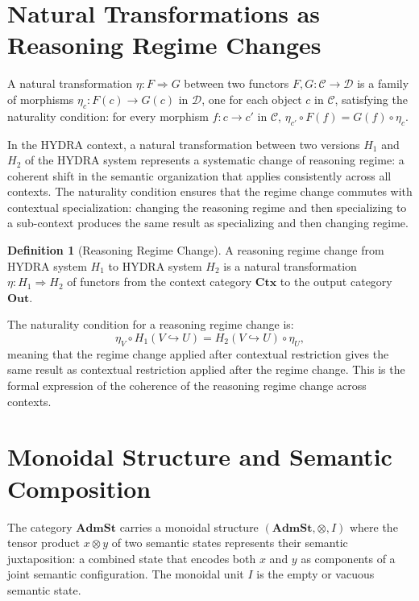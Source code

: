 \documentclass[12pt, a4paper, openany]{book}
\theoremstyle{plain}
\theoremstyle{definition}
\newtheorem{definition}[theorem]{Definition}
\theoremstyle{remark}
\begin{document}
\section{Natural Transformations as Reasoning Regime Changes}

A natural transformation $\eta: F \Rightarrow G$ between two functors $F, G: \mathcal{C} \to \mathcal{D}$ is a family of morphisms $\eta_c: F(c) \to G(c)$ in $\mathcal{D}$, one for each object $c$ in $\mathcal{C}$, satisfying the naturality condition: for every morphism $f: c \to c'$ in $\mathcal{C}$, $\eta_{c'} \circ F(f) = G(f) \circ \eta_c$.

In the HYDRA context, a natural transformation between two versions $H_1$ and $H_2$ of the HYDRA system represents a systematic change of reasoning regime: a coherent shift in the semantic organization that applies consistently across all contexts. The naturality condition ensures that the regime change commutes with contextual specialization: changing the reasoning regime and then specializing to a sub-context produces the same result as specializing and then changing regime.

\begin{definition}[Reasoning Regime Change]
A reasoning regime change from HYDRA system $H_1$ to HYDRA system $H_2$ is a natural transformation $\eta: H_1 \Rightarrow H_2$ of functors from the context category $\mathbf{Ctx}$ to the output category $\mathbf{Out}$.
\end{definition}

The naturality condition for a reasoning regime change is:
\[
\eta_V \circ H_1(V \hookrightarrow U) = H_2(V \hookrightarrow U) \circ \eta_U,
\]
meaning that the regime change applied after contextual restriction gives the same result as contextual restriction applied after the regime change. This is the formal expression of the coherence of the reasoning regime change across contexts.

\section{Monoidal Structure and Semantic Composition}

The category $\mathbf{AdmSt}$ carries a monoidal structure $(\mathbf{AdmSt}, \otimes, I)$ where the tensor product $x \otimes y$ of two semantic states represents their semantic juxtaposition: a combined state that encodes both $x$ and $y$ as components of a joint semantic configuration. The monoidal unit $I$ is the empty or vacuous semantic state.
\end{document}
